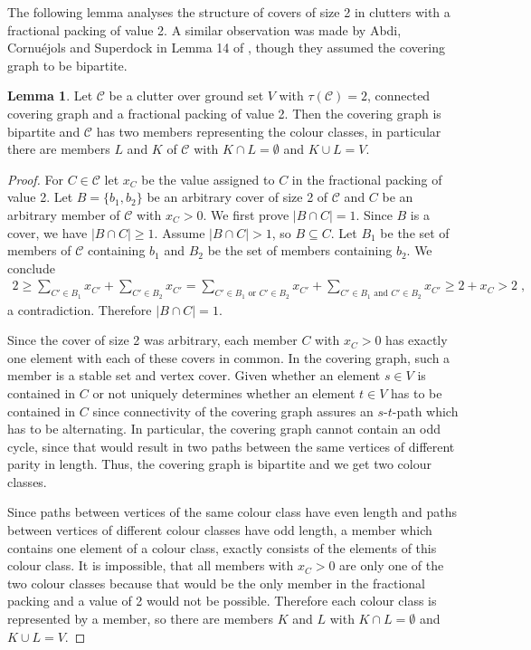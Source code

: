 \documentclass[a4paper, 12pt, twoside=false]{scrbook}
\theoremstyle{definition}
\newtheorem{lemma}[theorem]{Lemma}
\begin{document}
    The following lemma analyses the structure of covers of size 2 in clutters with a fractional packing of value 2. A similar observation was made by Abdi, Cornuéjols and Superdock in Lemma 14 of \cite{lemma}, though they assumed the covering graph to be bipartite.

   \begin{lemma}\label{bipartite}
       Let $\mathcal{C}$ be a clutter over ground set $V$ with $\tau(\mathcal{C})=2$, connected covering graph and a fractional packing of value 2.
       Then the covering graph is bipartite and $\mathcal{C}$ has two members representing the colour classes, in particular there are members $L$ and $K$ of $\mathcal{C}$ with $K \cap L = \emptyset$ and $K \cup L = V$.
   \end{lemma}

   \begin{proof}
       For $C \in \mathcal{C}$ let $x_C$ be the value assigned to $C$ in the fractional packing of value 2.
       Let $B=\{b_1,b_2\}$ be an arbitrary cover of size 2 of $\mathcal{C}$ and $C$ be an arbitrary member of $\mathcal{C}$ with $x_{C} > 0$.
       We first prove $|B\cap C| = 1$.
       Since $B$ is a cover, we have $|B\cap C| \geq 1$.
       Assume $|B \cap C| > 1$, so $B \subseteq C$.
       Let $B_1$ be the set of members of $\mathcal{C}$ containing $b_1$ and $B_2$ be the set of members containing $b_2$.
       We conclude
       \begin{align*}
           2 \geq \sum_{C'\in B_1} x_{C'} + \sum_{C' \in B_2} x_{C'} = \sum_{C' \in B_1 \text{ or } C' \in B_2} x_{C'} + \sum_{C' \in B_1 \text{ and } C' \in B_2} x_{C'} \geq 2 + x_C > 2 \;,
       \end{align*}
       a contradiction. Therefore $|B\cap C| = 1$.

       Since the cover of size 2 was arbitrary, each member $C$ with $x_C>0$ has exactly one element with each of these covers in common.
       In the covering graph, such a member is a stable set and vertex cover.
       Given whether an element $s \in V$ is contained in $C$ or not uniquely determines whether an element $t \in V$ has to be contained in $C$ since connectivity of the covering graph assures an $s$-$t$-path which has to be alternating.
       In particular, the covering graph cannot contain an odd cycle, since that would result in two paths between the same vertices of different parity in length. Thus, the covering graph is bipartite and we get two colour classes.

       Since paths between vertices of the same colour class have even length and paths between vertices of different colour classes have odd length, a member which contains one element of a colour class, exactly consists of the elements of this colour class.
       It is impossible, that all members with $x_C > 0$ are only one of the two colour classes because that would be the only member in the fractional packing and a value of 2 would not be possible.
       Therefore each colour class is represented by a member, so there are members $K$ and $L$ with $K \cap L = \emptyset$ and $K \cup L = V$.
   \end{proof}
\end{document}
